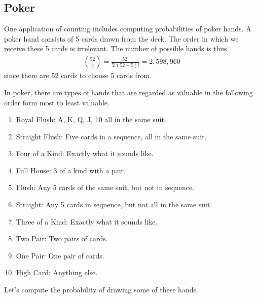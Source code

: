 \documentclass{tufte-book}
\theoremstyle{definition}
\numberwithin{theorem}{section}
\numberwithin{definition}{section}
\numberwithin{lemma}{section}
\numberwithin{corollary}{section}
\numberwithin{proposition}{section}
\numberwithin{remark}{section}
\numberwithin{claim}{section}
\numberwithin{observation}{section}
\numberwithin{fact}{section}
\numberwithin{assumption}{section}
\numberwithin{example}{section}
\numberwithin{exercise}{section}
\begin{document}
\subsection{Poker}
One application of counting includes computing probabilities of poker hands. A poker hand consists of 5 cards drawn from the deck. The order in which we receive these 5 cards is irrelevant. The number of possible hands is thus
\begin{align*}
\binom{52}{5} = \frac{52!}{5!(52 - 5)!} = 2,598,960
\end{align*}
since there are 52 cards to choose 5 cards from. 

In poker, there are types of hands that are regarded as valuable in the following order form most to least valuable.
\begin{enumerate}
\item Royal Flush: A, K, Q, J, 10 all in the same suit.
\item Straight Flush: Five cards in a sequence, all in the same suit.
\item Four of a Kind: Exactly what it sounds like.
\item Full House: 3 of a kind with a pair.
\item Flush: Any 5 cards of the same suit, but not in sequence.
\item Straight: Any 5 cards in sequence, but not all in the same suit.
\item Three of a Kind: Exactly what it sounds like.
\item Two Pair: Two pairs of cards.
\item One Pair: One pair of cards.
\item High Card: Anything else.
\end{enumerate}
Let's compute the probability of drawing some of these hands. 
\end{document}
